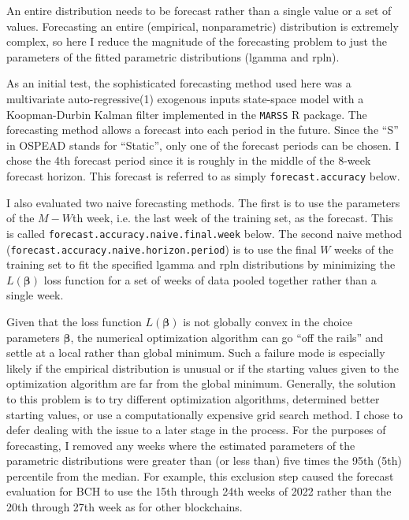 \documentclass[english]{article}
\begin{document}
An entire distribution needs to be forecast rather than a single value
or a set of values. Forecasting an entire (empirical, nonparametric)
distribution is extremely complex, so here I reduce the magnitude
of the forecasting problem to just the parameters of the fitted parametric
distributions (lgamma and rpln).

As an initial test, the sophisticated forecasting method used here
was a multivariate auto-regressive(1) exogenous inputs state-space
model with a Koopman-Durbin Kalman filter implemented in the \texttt{MARSS}
R package. The forecasting method allows a forecast into each period
in the future. Since the ``S'' in OSPEAD stands for ``Static'',
only one of the forecast periods can be chosen. I chose the 4th forecast
period since it is roughly in the middle of the 8-week forecast horizon.
This forecast is referred to as simply \texttt{forecast.accuracy}
below.

I also evaluated two naive forecasting methods. The first is to use
the parameters of the $M-W$th week, i.e. the last week of the \textquotedbl training
set\textquotedbl , as the forecast. This is called \texttt{forecast.accuracy.naive.final.week}
below. The second naive method (\texttt{forecast.accuracy.naive.horizon.period})
is to use the final $W$ weeks of the training set to fit the specified
lgamma and rpln distributions by minimizing the $L(\boldsymbol{\beta})$
loss function for a set of weeks of data pooled together rather than
a single week.

Given that the loss function $L(\boldsymbol{\beta})$ is not globally
convex in the choice parameters $\boldsymbol{\beta}$, the numerical
optimization algorithm can go ``off the rails'' and settle at a
local rather than global minimum. Such a failure mode is especially
likely if the empirical distribution is unusual or if the starting
values given to the optimization algorithm are far from the global
minimum. Generally, the solution to this problem is to try different
optimization algorithms, determined better starting values, or use
a computationally expensive grid search method. I chose to defer dealing
with the issue to a later stage in the process. For the purposes of
forecasting, I removed any weeks where the estimated parameters of
the parametric distributions were greater than (or less than) five
times the 95th (5th) percentile from the median. For example, this
exclusion step caused the forecast evaluation for BCH to use the 15th
through 24th weeks of 2022 rather than the 20th through 27th week
as for other blockchains.
\end{document}
